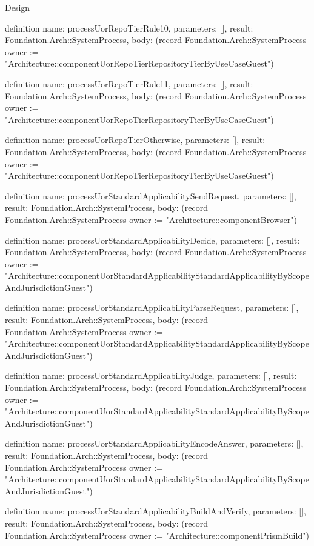 \begin{lexlean}{Design}
\begin{semanticmodule}
definition{
  name: processUorRepoTierRule10,
  parameters: [],
  result: Foundation.Arch::SystemProcess,
  body: (record Foundation.Arch::SystemProcess {owner := "Architecture::componentUorRepoTierRepositoryTierByUseCaseGuest"})
}

definition{
  name: processUorRepoTierRule11,
  parameters: [],
  result: Foundation.Arch::SystemProcess,
  body: (record Foundation.Arch::SystemProcess {owner := "Architecture::componentUorRepoTierRepositoryTierByUseCaseGuest"})
}

definition{
  name: processUorRepoTierOtherwise,
  parameters: [],
  result: Foundation.Arch::SystemProcess,
  body: (record Foundation.Arch::SystemProcess {owner := "Architecture::componentUorRepoTierRepositoryTierByUseCaseGuest"})
}

definition{
  name: processUorStandardApplicabilitySendRequest,
  parameters: [],
  result: Foundation.Arch::SystemProcess,
  body: (record Foundation.Arch::SystemProcess {owner := "Architecture::componentBrowser"})
}

definition{
  name: processUorStandardApplicabilityDecide,
  parameters: [],
  result: Foundation.Arch::SystemProcess,
  body: (record Foundation.Arch::SystemProcess {owner := "Architecture::componentUorStandardApplicabilityStandardApplicabilityByScopeAndJurisdictionGuest"})
}

definition{
  name: processUorStandardApplicabilityParseRequest,
  parameters: [],
  result: Foundation.Arch::SystemProcess,
  body: (record Foundation.Arch::SystemProcess {owner := "Architecture::componentUorStandardApplicabilityStandardApplicabilityByScopeAndJurisdictionGuest"})
}

definition{
  name: processUorStandardApplicabilityJudge,
  parameters: [],
  result: Foundation.Arch::SystemProcess,
  body: (record Foundation.Arch::SystemProcess {owner := "Architecture::componentUorStandardApplicabilityStandardApplicabilityByScopeAndJurisdictionGuest"})
}

definition{
  name: processUorStandardApplicabilityEncodeAnswer,
  parameters: [],
  result: Foundation.Arch::SystemProcess,
  body: (record Foundation.Arch::SystemProcess {owner := "Architecture::componentUorStandardApplicabilityStandardApplicabilityByScopeAndJurisdictionGuest"})
}

definition{
  name: processUorStandardApplicabilityBuildAndVerify,
  parameters: [],
  result: Foundation.Arch::SystemProcess,
  body: (record Foundation.Arch::SystemProcess {owner := "Architecture::componentPrismBuild"})
}


\end{semanticmodule}
\end{lexlean}
